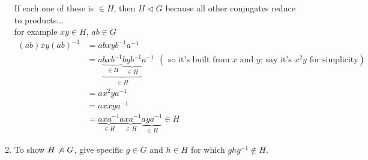 \begin{enumerate}
    If each one of these is $\in H$, then $H\triangleleft G$ because all other conjugates reduce to products...\\
    for example $xy\in H$, $ab\in G$\\
    \begin{align}
        (ab)xy(ab)^{-1}&=abxyb^{-1}a^{-1} \nonumber \\
        &=a\underbrace{\underbrace{bxb^{-1}}_{\in H}\underbrace{byb^{-1}}_{\in H}}_{\in H }a^{-1} \ \ (\text{ so it's built from $x$ and $y$; say it's $x^2y$ for simplicity})\nonumber \\
        &= ax^2ya^{-1} \nonumber \\
        &= axxya^{-1} \nonumber \\
        &= \underbrace{axa^{-1}}_{\in H} \underbrace{axa^{-1}}_{\in H} \underbrace{aya^{-1}}_{\in H} \in H \nonumber
    \end{align}
    \item To show $H \not \triangleleft \ G$, give specific $g\in G$ and $h\in H$ for which $ghg^{-1}\not\in H$.
\end{enumerate}

